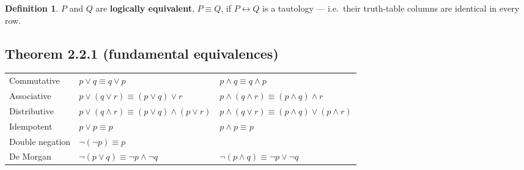 \documentclass{fkt-notes}
\theoremstyle{definition}
\newtheorem*{defn}{Definition}
\begin{document}
\begin{defn}
  $P$ and $Q$ are \textbf{logically equivalent}, $P\equiv Q$, if
  $P\leftrightarrow Q$ is a tautology --- i.e.\ their truth-table columns
  are identical in every row.
\end{defn}

\subsection{Theorem 2.2.1 (fundamental equivalences)}
%
\begin{rulepar}
  \begin{center}
    \renewcommand{\arraystretch}{1.15}
    \begin{tabular}{@{}lll@{}}
      \toprule
      Commutative     & $p\vee q\equiv q\vee p$                          & $p\wedge q\equiv q\wedge p$                        \\
      Associative     & $p\vee(q\vee r)\equiv(p\vee q)\vee r$            & $p\wedge(q\wedge r)\equiv(p\wedge q)\wedge r$      \\
      Distributive    & $p\vee(q\wedge r)\equiv(p\vee q)\wedge(p\vee r)$ & $p\wedge(q\vee r)\equiv(p\wedge q)\vee(p\wedge r)$ \\
      Idempotent      & $p\vee p\equiv p$                                & $p\wedge p\equiv p$                                \\
      Double negation & $\neg(\neg p)\equiv p$                           &                                                    \\
      De Morgan       & $\neg(p\vee q)\equiv\neg p\wedge\neg q$          & $\neg(p\wedge q)\equiv\neg p\vee\neg q$            \\
      \bottomrule
    \end{tabular}
  \end{center}
\end{rulepar}

\end{document}

